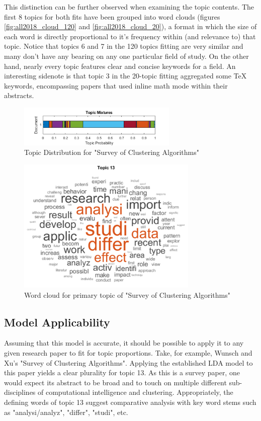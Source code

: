 \documentclass[conference]{IEEEtran}
\begin{document}
This distinction can be further observed when examining the topic contents. The first 8 topics for both fits have been grouped into word clouds (figures \ref{fig:all2018_cloud_120} and \ref{fig:all2018_cloud_20}), a format in which the size of each word is directly proportional to it's frequency within (and relevance to) that topic. Notice that topics 6 and 7 in the 120 topics fitting are very similar and many don't have any bearing on any one particular field of study. On the other hand, nearly every topic features clear and concise keywords for a field. An interesting sidenote is that topic 3 in the 20-topic fitting aggregated some TeX keywords, encompassing papers that used inline math mode within their abstracts.

\begin{figure}
	\centering
	\includegraphics[width=3.0in]{wunschpaper_topics.png}
	\caption{Topic Distribution for "Survey of Clustering Algorithms" \cite{1427769}}
	\label{fig:wunschpaper_topics}
\end{figure}

\begin{figure}
	\centering
	\includegraphics[width=3.4in]{wunschpaper_wordcloud.png}
	\caption{Word cloud for primary topic of "Survey of Clustering Algorithms" \cite{1427769}}
	\label{fig:wunschpaper_wordcloud}
\end{figure}

\subsection{Model Applicability}

Assuming that this model is accurate, it should be possible to apply it to any given research paper to fit for topic proportions. Take, for example, Wunsch and Xu's "Survey of Clustering Algorithms". Applying the established LDA model to this paper yields a clear plurality for topic 13. As this is a survey paper, one would expect its abstract to be broad and to touch on multiple different sub-disciplines of computational intelligence and clustering. Appropriately, the defining words of topic 13 suggest comparative analysis with key word stems such as "analysi/analyz", "differ", "studi", etc.
\end{document}
